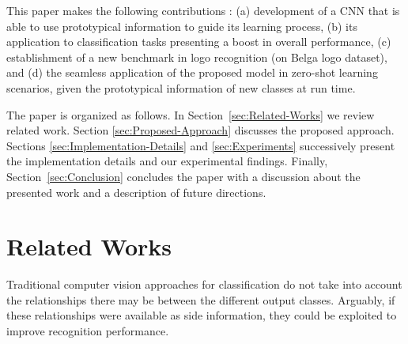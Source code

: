 \documentclass{bmvc2k}
\begin{document}

This paper makes the following contributions : (a) development of a CNN that is
able to use prototypical information to guide its learning process, (b) its application to classification
tasks presenting a boost in overall performance, (c) establishment of a new
benchmark in logo recognition (on Belga logo dataset), and (d) the seamless
application of the proposed model in zero-shot learning scenarios, given the
prototypical information of new classes at run time.


The paper is organized as follows. In Section~\ref{sec:Related-Works} we review related work. 
Section \ref{sec:Proposed-Approach} discusses the proposed approach. Sections
\ref{sec:Implementation-Details} and \ref{sec:Experiments} successively present the implementation details and
our experimental findings. Finally, Section~\ref{sec:Conclusion} concludes the
paper with a discussion about the presented work and a description of future
directions.


\section{\label{sec:Related-Works}Related Works}
Traditional computer vision approaches for classification do not take into
account the relationships there may be between the different output classes.
Arguably, if these relationships were available as side information, they could
be exploited to improve recognition performance.
\end{document}
